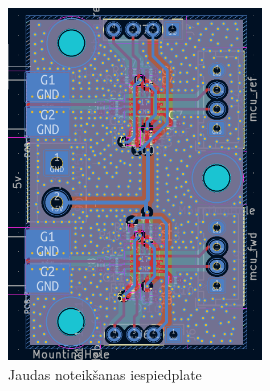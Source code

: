 \begin{figure}[H]
	\centering
    \includegraphics[width=0.6\textwidth]{pictures/board_powerdetector.png}\hspace{1cm}
    \caption{Jaudas noteikšanas iespiedplate}
\end{figure}
